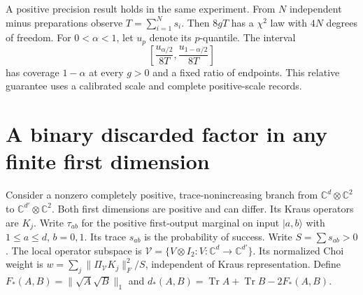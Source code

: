 \documentclass[11pt,letterpaper]{article}
\newcommand{\tr}{\operatorname{Tr}}\newcommand{\ket}[1]{\lvert#1\rangle}\newcommand{\proj}[1]{\ket{#1}\!\langle#1\rvert}
\begin{document}
A positive precision result holds in the same experiment. From $N$ independent minus preparations observe $T=\sum_{i=1}^N s_i$. Then $8gT$ has a $\chi^2$ law with $4N$ degrees of freedom. For $0<\alpha<1$, let $u_p$ denote its $p$-quantile. The interval
\[
 \left[\frac{u_{\alpha/2}}{8T},\frac{u_{1-\alpha/2}}{8T}\right]
\]
has coverage $1-\alpha$ at every $g>0$ and a fixed ratio of endpoints. This relative guarantee uses a calibrated scale and complete positive-scale records.

\section{A binary discarded factor in any finite first dimension}
Consider a nonzero completely positive, trace-nonincreasing branch from $\mathbb C^d\otimes\mathbb C^2$ to $\mathbb C^{d'}\otimes\mathbb C^2$. Both first dimensions are positive and can differ. Its Kraus operators are $K_j$. Write $\tau_{ab}$ for the positive first-output marginal on input $\ket{a,b}$ with $1\le a\le d$, $b=0,1$. Its trace $s_{ab}$ is the probability of success. Write $S=\sum s_{ab}>0$. The local operator subspace is $\mathcal V=\{V\otimes I_2: V:\mathbb C^d\to\mathbb C^{d'}\}$. Its normalized Choi weight is $w=\sum_j\|\Pi_{\mathcal V}K_j\|_F^2/S$, independent of Kraus representation. Define $F_*(A,B)=\|\sqrt A\sqrt B\|_1$ and $d_*(A,B)=\tr A+\tr B-2F_*(A,B)$.
\end{document}
